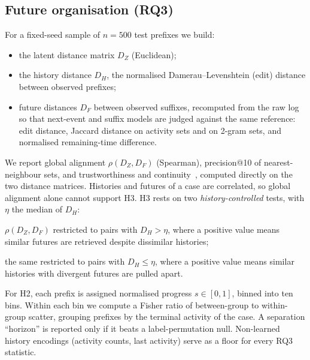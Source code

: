 \subsection{Future organisation (RQ3)}\label{sec:method-future}
For a fixed-seed sample of $n=500$ test prefixes we build:
\begin{itemize}[leftmargin=1.2em,itemsep=0pt,topsep=1pt]
  \item the latent distance matrix $D_Z$ (Euclidean);
  \item the history distance $D_H$, the normalised Damerau--Levenshtein (edit)
        distance between observed prefixes;
  \item future distances $D_F$ between observed suffixes, recomputed from the
        raw log so that next-event and suffix models are judged against the
        same reference: edit distance, Jaccard distance on activity sets and on
        2-gram sets, and normalised remaining-time difference.
\end{itemize}
We report global alignment $\rho(D_Z,D_F)$ (Spearman), precision@10 of
nearest-neighbour sets, and trustworthiness and
continuity~\cite{venna2001neighborhood}, computed directly on the two distance
matrices. Histories and futures of a case are correlated, so global alignment
alone cannot support H3. H3 rests on two \emph{history-controlled} tests,
with $\eta$ the median of $D_H$:
\begin{enumerate*}[label=(\roman*)]
\item $\rho(D_Z,D_F)$ restricted to pairs with $D_H>\eta$, where a positive
      value means similar futures are retrieved despite dissimilar histories;
\item the same restricted to pairs with $D_H\le\eta$, where a positive value
      means similar histories with divergent futures are pulled apart.
\end{enumerate*}
For H2, each prefix is assigned normalised progress $s\in[0,1]$, binned into
ten bins. Within each bin we compute a Fisher ratio of between-group to
within-group scatter, grouping prefixes by the terminal activity of the case.
A separation ``horizon'' is reported only if it beats a label-permutation
null. Non-learned history encodings (activity counts, last activity) serve
as a floor for every RQ3 statistic.

